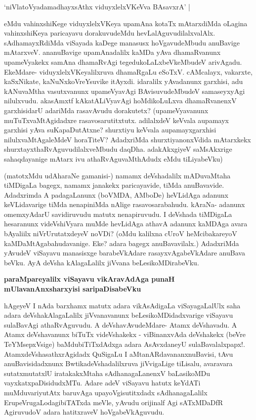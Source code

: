 \begin{shloka}
`niVlatoVyadamadhayxsAthx viduyxlelxVKeVva BAsavxrA' |
\end{shloka}

eMdu vahinxshiKege viduyxlelxVKeya upamAna kotaTx mAtarxdiMda oLagina vahinxshiKeya paricayavu dorakuvudeMdu hevLalAguvudilalxvalAlx. sAdhamayxRdiMda viSayada kaDege manasusx hoVgavudeMbudu anuBavige mAtarxveV. ananuBavige upamAnadalilx kaMDa yAva dhamaRvanunx upameVyakekx samAna dhamaRvAgi tegedukoLaLxbeVkeMbudeV arivAgadu. EkeMdare- viduyxlelxVKeyalilxruva dhamaRgaLu eSoTxV. cAMcalayx, vakarxte, kaSxNikate, kaNuNxkoVreYsuvike itAyxdi. idaralilx yAvadanunx garxhisi, adu kANuvaMtha vasutxvanunx upameVyavAgi BAvisuvudeMbudeV samaseyxyAgi nilulxvudu. akasAmxtf kAkatALiVyavAgi hoMdikoLuLxva dhamaRvanenxV garxhisidarU adariMda rasavAvudu dorakutetx? (upameVyavanunx muTuTxvaMtAgidadxre rasavosarutitxtutx. adilalxdeV keVvala aupamayx garxhisi yAva suKapaDutAtxne? shurxtiyu keVvala aupamayxgarxhisi nilulxvaMtAgaleMdeV horaTiteV? AdadxriMda shurxtiyanonxVdida mAtarxkekx shurxtayxthaRvAguvudilalxveMbudu daqDha. adakAkxgiyeV saMsAkxrige sahaqdayanige mAtarx ivu athaRvAguvaMthAdudx eMdu tiLiyabeVku)

(matotxMdu udAharaNe gamanisi-) namamx deVshadalilx mADuvaMtaha tiMDigaLa bagegx, namamx janakekx paricayavide, tiMda anuBavavide. Adadxrimda A padagaLanunx (boVMDA, AMboDe) heVLidAga adanunx keVLidavarige tiMda nenapiniMda nAlige rasavosarabahudu. kAraNa- adanunx omemxyAdarU savidiruvudu matutx nenapiruvudu. I deVshada tiMDigaLa hesaranunx videVshiVyara muMde hevLidAga athavA adanunx kaMDAga avara bAyaliilx niVrUrutatxdeyeV noVDi? (oMdu kalilxna cUroV heMcibakareyoV kaMDaMtAgabahudavanige. Eke? adara bagegx anuBavavilalx.) AdadxriMda yAvudeV viSayavu manasisxge barabeVkAdare rasayxvAgabeVkAdare anuBava beVku. AyA deVsha kAlagaLalilx jiVvana beLesikoMDirabeVku.

{\bf paraMpareyalilx viSayavu vikAravAdAga punaH mUlavanAnxsharxyisi saripaDisabeVku}

hAgeyeV I nAda barxhamx matutx adara vikAsAdigaLa viSayagaLalUlx saha adara deVshakAlagaLalilx jiVvanavanunx beLesikoMDidadxvarige viSayavu sulaBavAgi athaRvAguvudu. A deVshavAvudeMdare- Atamx deVshavadu. A Atamx deVshavanunx biTuTx videVshakekx - viBinanxvAda deVshakekx (beVre TeYMsepxVsige) baMdubiTiTxdAdxga adara AsAvxdaneyU sulaBavalalxpapx!. AtamxdeVshasathxrAgidadx QuSigaLu I aMtanARdavananxnuBavisi, tAvu anuBavisidadxnunx BwtikadeVshadalilxruva jiVvigaLige tiLisalu, avaravara sutatxmutatxlU iratakakxMtaha sAdhanagaLanenxV baLasikoMDu vayxkatxpaDisidudxMTu. Adare adeV viSayavu hatutx keYdATi muMduvariyutAtx baruvAga upayoVgisutitxdadx sAdhanagaLalilx ErupeVrugaLodagibiTATxda meVle, yAvudu orijinalf Agi sATxMDaDfR AgiruvudoV adara hatitxraveV hoVgabeVkAguvudu.

